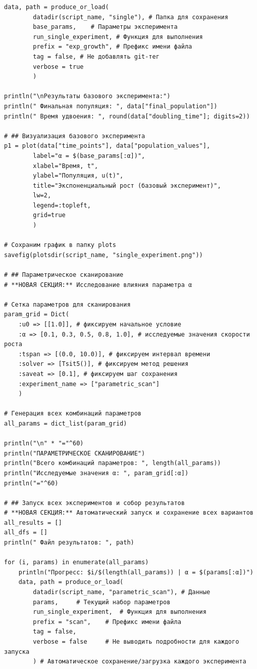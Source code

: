 \documentclass[
  english,
  russian,
  12pt,
  a4paper,
  DIV=11,
  numbers=noendperiod]{scrreprt}
\begin{document}
\begin{verbatim}
data, path = produce_or_load(
        datadir(script_name, "single"), # Папка для сохранения
        base_params,    # Параметры эксперимента
        run_single_experiment, # Функция для выполнения
        prefix = "exp_growth", # Префикс имени файла
        tag = false, # Не добавлять git-тег
        verbose = true
        )
        
println("\nРезультаты базового эксперимента:")
println(" Финальная популяция: ", data["final_population"])
println(" Время удвоения: ", round(data["doubling_time"]; digits=2))

# ## Визуализация базового эксперимента
p1 = plot(data["time_points"], data["population_values"],
        label="α = $(base_params[:α])",
        xlabel="Время, t",
        ylabel="Популяция, u(t)",
        title="Экспоненциальный рост (базовый эксперимент)",
        lw=2,
        legend=:topleft,
        grid=true
        )

# Сохраним график в папку plots
savefig(plotsdir(script_name, "single_experiment.png"))

# ## Параметрическое сканирование
# **НОВАЯ СЕКЦИЯ:** Исследование влияния параметра α

# Сетка параметров для сканирования
param_grid = Dict(
    :u0 => [[1.0]], # фиксируем начальное условие
    :α => [0.1, 0.3, 0.5, 0.8, 1.0], # исследуемые значения скорости роста
    :tspan => [(0.0, 10.0)], # фиксируем интервал времени
    :solver => [Tsit5()], # фиксируем метод решения
    :saveat => [0.1], # фиксируем шаг сохранения
    :experiment_name => ["parametric_scan"]
    )
    
# Генерация всех комбинаций параметров
all_params = dict_list(param_grid)

println("\n" * "="^60)
println("ПАРАМЕТРИЧЕСКОЕ СКАНИРОВАНИЕ")
println("Всего комбинаций параметров: ", length(all_params))
println("Исследуемые значения α: ", param_grid[:α])
println("="^60)

# ## Запуск всех экспериментов и собор результатов
# **НОВАЯ СЕКЦИЯ:** Автоматический запуск и сохранение всех вариантов
all_results = []
all_dfs = []
println(" Файл результатов: ", path)

for (i, params) in enumerate(all_params)
    println("Прогресс: $i/$(length(all_params)) | α = $(params[:α])")
    data, path = produce_or_load(
        datadir(script_name, "parametric_scan"), # Данные
        params,     # Текущий набор параметров
        run_single_experiment,  # Функция для выполнения
        prefix = "scan",    # Префикс имени файла
        tag = false,
        verbose = false     # Не выводить подробности для каждого запуска
        ) # Автоматическое сохранение/загрузка каждого эксперимента
    

\end{verbatim}
\end{document}
